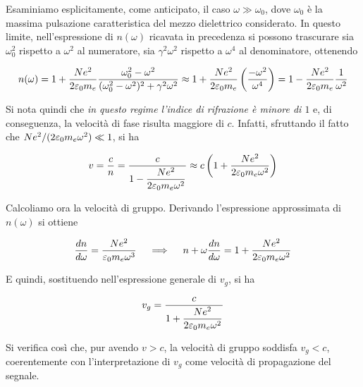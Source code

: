 Esaminiamo esplicitamente, come anticipato, il caso $\omega \gg \omega_0$, dove $\omega_0$ è la massima pulsazione caratteristica del mezzo dielettrico considerato. In questo limite, nell'espressione di $n(\omega)$ ricavata in precedenza si possono trascurare sia $\omega_0^2$ rispetto a $\omega^2$ al numeratore, sia $\gamma^2 \omega^2$ rispetto a $\omega^4$ al denominatore, ottenendo 

\begin{equation}
    n(\omega) = 1 + \frac{N e^2}{2 \varepsilon_0 m_e} \frac{\omega_0^2 - \omega^2}{(\omega_0^2 - \omega^2)^2 + \gamma^2 \omega^2} \approx 1 + \frac{N e^2}{2 \varepsilon_0 m_e} \left( \frac{-\omega^2}{\omega^4} \right) = 1 - \frac{N e^2}{2 \varepsilon_0 m_e} \frac{1}{\omega^2}
\end{equation}

Si nota quindi che \emph{in questo regime l'indice di rifrazione è minore di $1$} e, di conseguenza, la velocità di fase risulta maggiore di $c$. Infatti, sfruttando il fatto che $Ne^2 / (2 \varepsilon_0 m_e \omega^2) \ll 1$, si ha 

\begin{equation}
    v = \frac{c}{n} = \frac{c}{1 - \dfrac{N e^2}{2 \varepsilon_0 m_e \omega^2}} \approx c \left( 1 + \frac{N e^2}{2 \varepsilon_0 m_e \omega^2} \right)
\end{equation}

\newpage

Calcoliamo ora la velocità di gruppo. Derivando l'espressione approssimata di $n(\omega)$ si ottiene 

\begin{equation}
    \frac{dn}{d\omega} = \frac{N e^2}{\varepsilon_0 m_e \omega^3} \quad \implies \quad n + \omega \frac{dn}{d\omega} = 1 + \frac{N e^2}{2 \varepsilon_0 m_e \omega^2}
\end{equation}

E quindi, sostituendo nell'espressione generale di $v_g$, si ha 

\begin{tcolorbox}[colback=yellow!10!white, colframe=orange!70!black, boxrule=0.8pt]
\begin{equation}
    v_g = \frac{c}{1 + \dfrac{N e^2}{2 \varepsilon_0 m_e \omega^2}}
\end{equation}
\end{tcolorbox}

Si verifica così che, pur avendo $v > c$, la velocità di gruppo soddisfa $v_g < c$, coerentemente con l'interpretazione di $v_g$ come velocità di propagazione del segnale.

